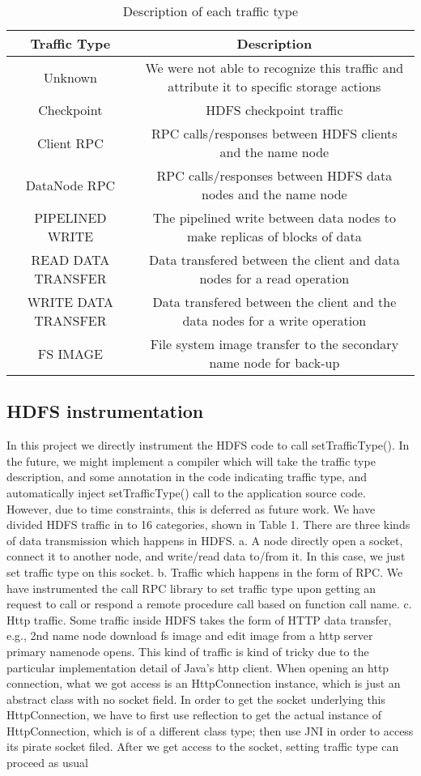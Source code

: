 \begin{table*}
\centering
\begin{tabular}{|c|c|} \hline
Traffic Type & Description\\ \hline
Unknown & We were not able to recognize this traffic and attribute it to specific storage actions \\ \hline
Checkpoint & HDFS checkpoint traffic\\ \hline
Client RPC & RPC calls/responses between HDFS clients and the name node\\ \hline
DataNode RPC & RPC calls/responses between HDFS data nodes and the name node\\ \hline
PIPELINED WRITE & The pipelined write between data nodes to make replicas of blocks of data\\ \hline
READ DATA TRANSFER & Data transfered between the client and data nodes for a read operation\\ \hline
WRITE DATA TRANSFER & Data transfered between the client and the data nodes for a write operation \\ \hline
FS IMAGE & File system image transfer to the secondary name node for back-up \\ \hline
\end{tabular}\label{table:type}
\caption{Description of each traffic type}
\end{table*}

\subsection{HDFS instrumentation}
     In this project we directly instrument the HDFS code to call setTrafficType(). In the future, we might implement a compiler which will take the traffic type description, and some annotation in the code indicating traffic type, and automatically inject setTrafficType() call to the application source code. However, due to time constraints, this is deferred as future work. 
       We have divided HDFS traffic in to 16 categories, shown in Table 1. There are three kinds of data transmission which happens in HDFS.
     a. A node directly open a socket, connect it to another node, and write/read data to/from it. In this case, we just set traffic type on this socket. 
     b. Traffic which happens in the form of RPC. We have instrumented the call RPC library to set traffic type upon getting an request to call or respond a remote procedure call based on function call name. 
     c. Http traffic. Some traffic inside HDFS takes the form of HTTP data transfer, e.g., 2nd name node download fs image and edit image from a http server primary namenode opens. This kind of traffic is kind of tricky due to the particular implementation detail of Java's http client. When opening an http connection, what we got access is an HttpConnection instance, which is just an abstract class with no socket field. In order to get the socket underlying this HttpConnection, we have to first use reflection to get the actual instance of HttpConnection, which is of a different class type; then use JNI in order to access its pirate socket filed. After we get access to the socket, setting traffic type can proceed as usual 

